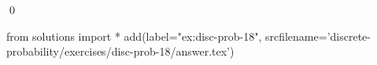 
\begin{ex} 
  \label{ex:disc-prob-18}
  
  \qed
\end{ex} 
\begin{python0}
from solutions import *
add(label="ex:disc-prob-18",
    srcfilename='discrete-probability/exercises/disc-prob-18/answer.tex') 
\end{python0}
